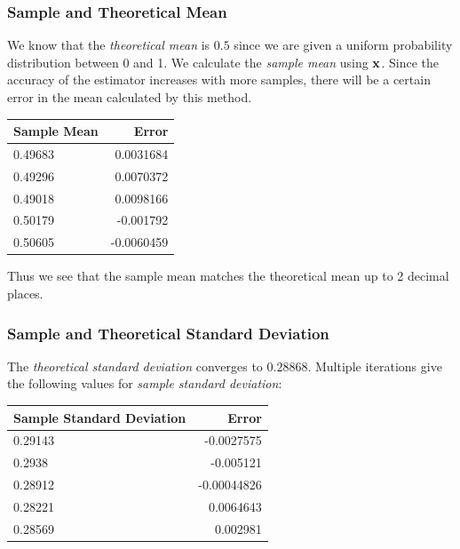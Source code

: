 \subsubsection{Sample and Theoretical Mean}

We know that the \textit{theoretical mean} is $0.5$ since we are given a uniform probability distribution between 0 and 1. We calculate the \textit{sample mean} using $\bf x$. Since the accuracy of the estimator increases with more samples, there will be a certain error in the mean calculated by this method.

\begin{table}[h!]
\centering
\begin{tabular}{|l|r|} \hline

Sample Mean	&Error \\ \hline
0.49683		&0.0031684	\\ \hline
0.49296		&0.0070372	\\ \hline
0.49018		&0.0098166	\\ \hline
0.50179		&-0.001792 \\ \hline
0.50605		&-0.0060459	\\ \hline
\end{tabular}
\end{table}

Thus we see that the sample mean matches the theoretical mean up to 2 decimal places.

\subsubsection{Sample and Theoretical Standard Deviation}

The \textit{theoretical standard deviation} converges to $0.28868$. Multiple iterations give the following values for \textit{sample standard deviation}:

\begin{table}[h!]
\centering
\begin{tabular}{|l|r|} \hline

Sample Standard Deviation	&Error \\ \hline
0.29143						&-0.0027575	\\ \hline
0.2938						&-0.005121	\\ \hline
0.28912						&-0.00044826	\\ \hline
0.28221						&0.0064643 \\ \hline
0.28569						&0.002981	\\ \hline
\end{tabular}
\end{table}

